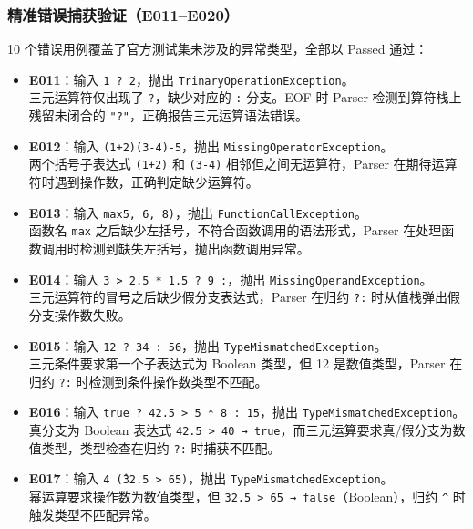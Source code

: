 \documentclass[a4paper]{article}
\begin{document}
\subsubsection{精准错误捕获验证（E011--E020）}

10 个错误用例覆盖了官方测试集未涉及的异常类型，全部以 Passed 通过：

\begin{itemize}
    \item \textbf{E011}：输入 \texttt{1 ? 2}，抛出 \texttt{TrinaryOperationException}。\\
    三元运算符仅出现了 \texttt{?}，缺少对应的 \texttt{:} 分支。EOF 时 Parser 检测到算符栈上残留未闭合的 \texttt{"?"}，正确报告三元运算语法错误。
    
    \item \textbf{E012}：输入 \texttt{(1+2)(3-4)-5}，抛出 \texttt{MissingOperatorException}。\\
    两个括号子表达式 \texttt{(1+2)} 和 \texttt{(3-4)} 相邻但之间无运算符，Parser 在期待运算符时遇到操作数，正确判定缺少运算符。
    
    \item \textbf{E013}：输入 \texttt{max5, 6, 8)}，抛出 \texttt{FunctionCallException}。\\
    函数名 \texttt{max} 之后缺少左括号，不符合函数调用的语法形式，Parser 在处理函数调用时检测到缺失左括号，抛出函数调用异常。
    
    \item \textbf{E014}：输入 \texttt{3 > 2.5 * 1.5 ? 9 :}，抛出 \texttt{MissingOperandException}。\\
    三元运算符的冒号之后缺少假分支表达式，Parser 在归约 \texttt{?:} 时从值栈弹出假分支操作数失败。
    
    \item \textbf{E015}：输入 \texttt{12 ? 34 : 56}，抛出 \texttt{TypeMismatchedException}。\\
    三元条件要求第一个子表达式为 Boolean 类型，但 12 是数值类型，Parser 在归约 \texttt{?:} 时检测到条件操作数类型不匹配。
    
    \item \textbf{E016}：输入 \texttt{true ? 42.5 > 5 * 8 : 15}，抛出 \texttt{TypeMismatchedException}。\\
    真分支为 Boolean 表达式 \texttt{42.5 > 40 → true}，而三元运算要求真/假分支为数值类型，类型检查在归约 \texttt{?:} 时捕获不匹配。
    
    \item \textbf{E017}：输入 \texttt{4 \^ (32.5 > 65)}，抛出 \texttt{TypeMismatchedException}。\\
    幂运算要求操作数为数值类型，但 \texttt{32.5 > 65 → false}（Boolean），归约 \texttt{\^} 时触发类型不匹配异常。
    

\end{itemize}
\end{document}
